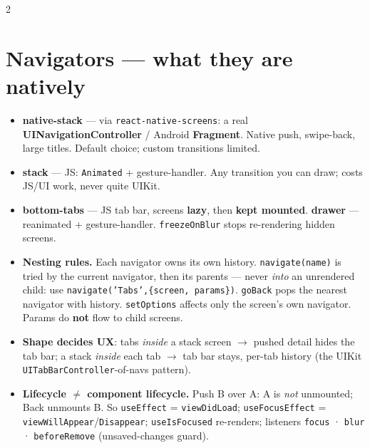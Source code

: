 \documentclass[8pt]{extarticle}
\begin{document}
\begin{multicols}{2}
\raggedright

\section{Navigators — what they are natively}
\begin{itemize}
  \item \textbf{native-stack} — via \texttt{react-native-screens}: a real
        \textbf{UINavigationController} / Android \textbf{Fragment}. Native push,
        swipe-back, large titles. Default choice; custom transitions limited.
  \item \textbf{stack} — JS: \texttt{Animated} + gesture-handler. Any transition you can
        draw; costs JS/UI work, never quite UIKit.
  \item \textbf{bottom-tabs} — JS tab bar, screens \textbf{lazy}, then \textbf{kept
        mounted}. \textbf{drawer} — reanimated + gesture-handler.
        \texttt{freezeOnBlur} stops re-rendering hidden screens.
  \item \textbf{Nesting rules.} Each navigator owns its own history.
        \texttt{navigate(name)} is tried by the current navigator, then its parents —
        never \emph{into} an unrendered child: use
        \texttt{navigate('Tabs',\{screen, params\})}. \texttt{goBack} pops the nearest
        navigator with history. \texttt{setOptions} affects only the screen's own
        navigator. Params do \textbf{not} flow to child screens.
  \item \textbf{Shape decides UX}: tabs \emph{inside} a stack screen $\to$ pushed detail
        hides the tab bar; a stack \emph{inside} each tab $\to$ tab bar stays, per-tab
        history (the UIKit \texttt{UITabBarController}-of-navs pattern).
  \item \textbf{Lifecycle $\ne$ component lifecycle.} Push B over A: A is \emph{not}
        unmounted; Back unmounts B. So \texttt{useEffect} = \texttt{viewDidLoad};
        \texttt{useFocusEffect} = \texttt{viewWillAppear}/\texttt{Disappear};
        \texttt{useIsFocused} re-renders; listeners \texttt{focus} · \texttt{blur} ·
        \texttt{beforeRemove} (unsaved-changes guard).
\end{itemize}


\end{multicols}
\end{document}
